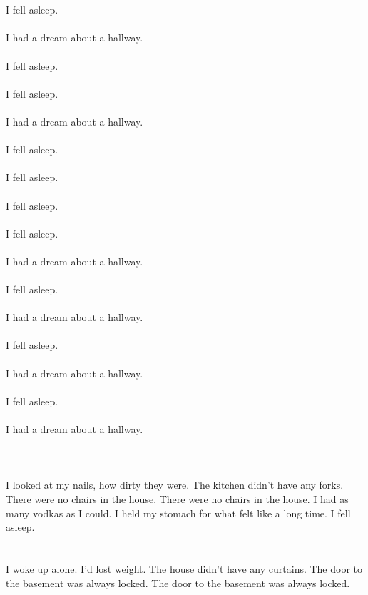 \documentclass{article}
\begin{document}
    \section{}
    I fell asleep.\\\\I had a dream about a hallway.\\\\ I fell asleep.\\\\ I fell asleep.\\\\I had a dream about a hallway.\\\\ I fell asleep.\\\\ I fell asleep.\\\\ I fell asleep.\\\\ I fell asleep.\\\\I had a dream about a hallway.\\\\ I fell asleep.\\\\I had a dream about a hallway.\\\\ I fell asleep.\\\\I had a dream about a hallway.\\\\ I fell asleep.\\\\I had a dream about a hallway.\\\\ 
    \newpage
    
    \section{}
    I looked at my nails, how dirty they were. The kitchen didn't have any forks. There were no chairs in the house. There were no chairs in the house. I had as many vodkas as I could. I held my stomach for what felt like a long time. I fell asleep.  
    \newpage
    
    \section{}
    I woke up alone. I'd lost weight. The house didn't have any curtains. The door to the basement was always locked. The door to the basement was always locked.  
    \newpage
    
\end{document}
